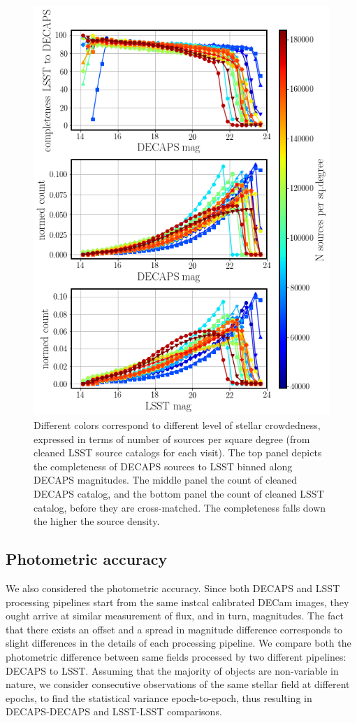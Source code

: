 \documentclass[DM,lsstdraft,toc,usenatbib]{lsstdoc}
\begin{document}
\begin{figure}
\begin{centering}
\includegraphics[width=0.7\columnwidth]{figs/14_completeness_count_lsst_decaps_N_true.png}
\caption{Different colors correspond to different level of stellar crowdedness, expressed in terms of number of sources per square degree (from cleaned LSST source catalogs for each visit). The top panel depicts the completeness of DECAPS sources to LSST binned along DECAPS magnitudes. The middle panel the count of cleaned DECAPS catalog, and the bottom panel the count of cleaned LSST catalog, before they are cross-matched.  The completeness  falls down the higher the  source density. }
\label{fig:completeness}
\end{centering}
\end{figure} 



\subsection{Photometric accuracy}

We also considered the photometric accuracy. Since both DECAPS and LSST processing pipelines start from the same instcal calibrated DECam images, they ought arrive at similar measurement of flux, and in turn, magnitudes.  The fact that there exists an offset and a spread in magnitude difference corresponds to slight differences in the details of each processing pipeline. We compare both the photometric difference between same fields processed by two different pipelines: DECAPS to LSST. Assuming that the majority of objects are non-variable in nature, we consider consecutive observations of the same stellar field at different epochs, to find the statistical variance epoch-to-epoch, thus resulting in DECAPS-DECAPS and LSST-LSST comparisons.
\end{document}
